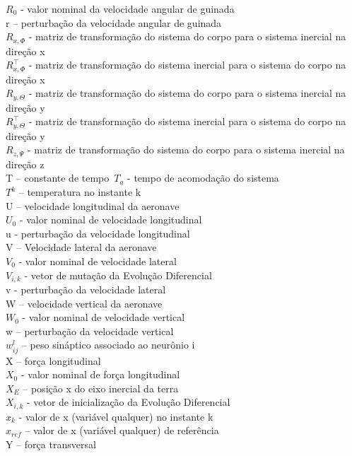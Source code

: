 \documentclass[10pt,a4paper]{article}
\numberwithin{equation}{section}
\begin{document}
$R_0$ - valor nominal da velocidade angular de guinada\\
r – perturbação da velocidade angular de guinada\\
$R_{x,\Phi}$  - matriz de transformação do sistema do corpo para o sistema inercial na direção x\\
$R_{x,\Phi}^\top$  - matriz de transformação do sistema inercial para o sistema do corpo na direção x \\
$R_{y,\Theta}$  - matriz de transformação do sistema do corpo para o sistema inercial na direção y\\
$R_{y,\Theta}^\top$  - matriz de transformação do sistema inercial para o sistema do corpo na direção y\\
$R_{z,\Psi}$  - matriz de transformação do sistema do corpo para o sistema inercial na direção z\\
T – constante de tempo\
$T_a$ - tempo de acomodação do sistema\\
$T^k$ – temperatura no instante k\\
U – velocidade longitudinal da aeronave\\
$U_0$ - valor nominal de velocidade longitudinal\\
u - perturbação da velocidade longitudinal \\
V – Velocidade lateral da aeronave\\
$V_0$ - valor nominal de velocidade lateral\\
$V_{i,k}$ - vetor de mutação da Evolução Diferencial\\
v - perturbação da velocidade lateral\\
W – velocidade vertical  da aeronave\\
$W_0$ - valor nominal de velocidade vertical \\
w – perturbação da velocidade vertical\\
$w_{ij}^l$ – peso sináptico associado ao neurônio i\\
X – força longitudinal \\
$X_0$ - valor nominal de força longitudinal\\
$X_E$ – posição x do eixo inercial da terra\\
$X_{i,k}$ - vetor de inicialização da Evolução Diferencial\\
$x_k$ - valor de x (variável qualquer) no instante k\\
$x_{ref}$ – valor de x (variável qualquer) de referência\\
Y – força transversal \\
\end{document}

